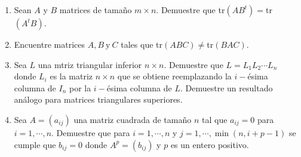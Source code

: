 \documentclass[11pt,letterpaper]{article}
\begin{document}
\begin{enumerate}
\item Sean $A$ y $B$ matrices de tamaño $m\times n$. Demuestre que tr$(AB^t)=$tr$(A^tB)$. 

\item Encuentre matrices $A, B \ \text{y} \ C$ tales que tr$(ABC)\neq$tr$(BAC)$.

\item Sea $L$ una mtriz triangular inferior $n\times n$. Demuestre que $L=L_1L_2\cdots L_n$ donde $L_i$ es la matriz $n\times n$ que se obtiene reemplazando la $i-$ésima columna de $I_n$ por la $i-$ésima columna de $L$. Demuestre un resultado análogo para matrices triangulares superiores.

\item Sea $A=(a_{ij})$ una matriz cuadrada de tamaño $n$ tal que $a_{ij}=0$ para $i=1, \cdots , n.$ Demuestre que para $i=1, \cdots , n$ y $j=1, \cdots , \min (n,i+p-1)$ se cumple que $b_{ij}=0$ donde $A^p=(b_{ij})$ y $p$ es un entero positivo. 



\end{enumerate}
\end{document}
